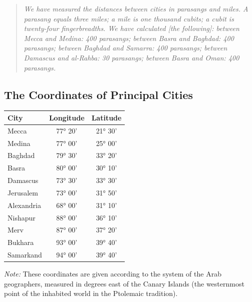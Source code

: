 \documentclass[11pt,a4paper]{article}
\begin{document}
\bigskip

\begin{quote}
\small
\textit{We have measured the distances between cities in parasangs and miles. A parasang equals three miles; a mile is one thousand cubits; a cubit is twenty-four fingerbreadths. We have calculated [the following]: between Mecca and Medina: 400 parasangs; between Basra and Baghdad: 400 parasangs; between Baghdad and Samarra: 400 parasangs; between Damascus and al-Rahba: 30 parasangs; between Basra and Oman: 400 parasangs.}
\end{quote}

\vspace{0.5cm}

\subsection{The Coordinates of Principal Cities}

\begin{center}
\begin{longtable}{lcc}
\toprule
\textbf{City} & \textbf{Longitude} & \textbf{Latitude} \\
\midrule
\endhead
Mecca & 77° 20' & 21° 30' \\
Medina & 77° 00' & 25° 00' \\
Baghdad & 79° 30' & 33° 20' \\
Basra & 80° 00' & 30° 10' \\
Damascus & 73° 30' & 33° 30' \\
Jerusalem & 73° 00' & 31° 50' \\
Alexandria & 68° 00' & 31° 10' \\
Nishapur & 88° 00' & 36° 10' \\
Merv & 87° 00' & 37° 20' \\
Bukhara & 93° 00' & 39° 40' \\
Samarkand & 94° 00' & 39° 40' \\
\bottomrule
\end{longtable}
\end{center}

\textit{Note:} These coordinates are given according to the system of the Arab geographers, measured in degrees east of the Canary Islands (the westernmost point of the inhabited world in the Ptolemaic tradition).

\clearpage

\end{document}
